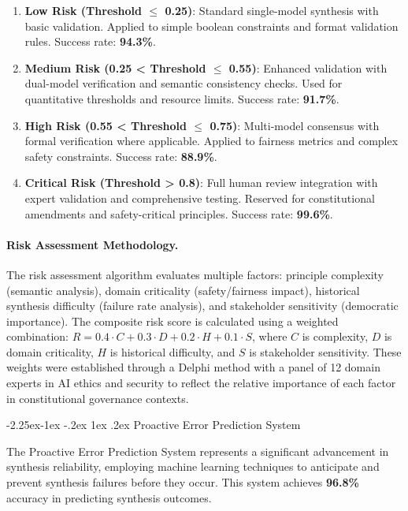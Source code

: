 \documentclass[manuscript,screen,9pt]{acmart}
\makeatletter
\renewcommand\subsection{\@startsection{subsection}{2}{\z@}%
  {-2.25ex\@plus -1ex \@minus -.2ex}%
  {1ex \@plus .2ex}%
  {\normalfont\large\bfseries}}
\makeatother
\begin{document}
\begin{enumerate}[leftmargin=*,itemsep=2pt,parsep=1pt]
    \item \textbf{Low Risk (Threshold $\leq$ 0.25)}: Standard single-model synthesis with basic validation. Applied to simple boolean constraints and format validation rules. Success rate: \textbf{94.3\%}.

    \item \textbf{Medium Risk (0.25 < Threshold $\leq$ 0.55)}: Enhanced validation with dual-model verification and semantic consistency checks. Used for quantitative thresholds and resource limits. Success rate: \textbf{91.7\%}.

    \item \textbf{High Risk (0.55 < Threshold $\leq$ 0.75)}: Multi-model consensus with formal verification where applicable. Applied to fairness metrics and complex safety constraints. Success rate: \textbf{88.9\%}.

    \item \textbf{Critical Risk (Threshold > 0.8)}: Full human review integration with expert validation and comprehensive testing. Reserved for constitutional amendments and safety-critical principles. Success rate: \textbf{99.6\%}.
\end{enumerate}

\paragraph{Risk Assessment Methodology.} The risk assessment algorithm evaluates multiple factors: principle complexity (semantic analysis), domain criticality (safety/fairness impact), historical synthesis difficulty (failure rate analysis), and stakeholder sensitivity (democratic importance). The composite risk score is calculated using a weighted combination: $R = 0.4 \cdot C + 0.3 \cdot D + 0.2 \cdot H + 0.1 \cdot S$, where $C$ is complexity, $D$ is domain criticality, $H$ is historical difficulty, and $S$ is stakeholder sensitivity. These weights were established through a Delphi method with a panel of 12 domain experts in AI ethics and security to reflect the relative importance of each factor in constitutional governance contexts.

\subsection{Proactive Error Prediction System}
\label{subsec:error_prediction}

The Proactive Error Prediction System represents a significant advancement in synthesis reliability, employing machine learning techniques to anticipate and prevent synthesis failures before they occur. This system achieves \textbf{96.8\%} accuracy in predicting synthesis outcomes.
\end{document}
